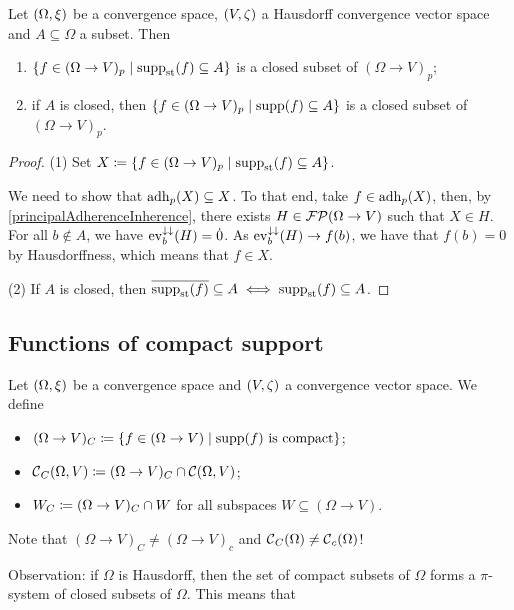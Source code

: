 \begin{lemma}
Let $\sSet{\Omega, \xi}$ be a convergence space, $\sSet{V,\zeta}$ a Hausdorff convergence vector space and $A\subseteq \Omega$ a subset. Then
\begin{enumerate}
\item $\setbuilder{f\in (\Omega\to V)_p}{\supp_\text{st}(f)\subseteq A}$ is a closed subset of $(\Omega\to V)_p$;
\item if $A$ is closed, then $\setbuilder{f\in (\Omega\to V)_p}{\supp(f)\subseteq A}$ is a closed subset of $(\Omega\to V)_p$.
\end{enumerate}
\end{lemma}
\begin{proof}
(1) Set $X \defeq \setbuilder{f\in (\Omega\to V)_p}{\supp_\text{st}(f)\subseteq A}$.

We need to show that $\operatorname{adh}_p(X) \subseteq X$. To that end, take $f\in \operatorname{adh}_p(X)$, then, by \ref{principalAdherenceInherence}, there exists $H\in \operatorname{\mathcal{FP}}(\Omega\to V)$ such that $X\in H$. For all $b\notin A$, we have $\operatorname{ev}_b^{\downarrow\downarrow}(H) = \dot{0}$. As $\operatorname{ev}_b^{\downarrow\downarrow}(H) \to f(b)$, we have that $f(b) = 0$ by Hausdorffness, which means that $f\in X$.

(2) If $A$ is closed, then $\overline{\operatorname{supp}_\text{st}(f)}\subseteq A \iff \operatorname{supp}_\text{st}(f) \subseteq A$.
\end{proof}

\subsection{Functions of compact support}
\begin{definition}
Let $\sSet{\Omega, \xi}$ be a convergence space and $\sSet{V,\zeta}$ a convergence vector space. We define
\begin{itemize}
\item $(\Omega\to V)_C \defeq \setbuilder{f\in (\Omega\to V)}{\text{$\supp(f)$ is compact}}$;
\item $\operatorname{\mathcal{C}}_C(\Omega,V) \coloneqq (\Omega\to V)_C \cap \operatorname{\mathcal{C}}(\Omega, V)$;
\item $W_C \coloneqq (\Omega\to V)_C \cap W$ for all subspaces $W\subseteq (\Omega\to V)$.
\end{itemize}
\end{definition}
Note that $(\Omega\to V)_C \neq (\Omega\to V)_c$ and $\operatorname{\mathcal{C}}_C(\Omega) \neq \operatorname{\mathcal{C}}_c(\Omega)$!

Observation: if $\Omega$ is Hausdorff, then the set of compact subsets of $\Omega$ forms a $\pi$-system of closed subsets of $\Omega$. This means that


